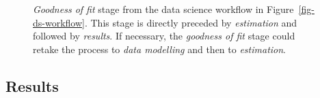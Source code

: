 \documentclass[
  letterpaper,
  DIV=11,
  numbers=noendperiod]{scrreprt}
\begin{document}
\begin{figure}


\caption{\label{fig-ds-workflow-goodness-of-fit}\emph{Goodness of fit}
stage from the data science workflow in Figure~\ref{fig-ds-workflow}.
This stage is directly preceded by \emph{estimation} and followed by
\emph{results}. If necessary, the \emph{goodness of fit} stage could
retake the process to \emph{data modelling} and then to
\emph{estimation}.}

\end{figure}%

\subsection{Results}\label{sec-ds-workflow-results}
\end{document}
